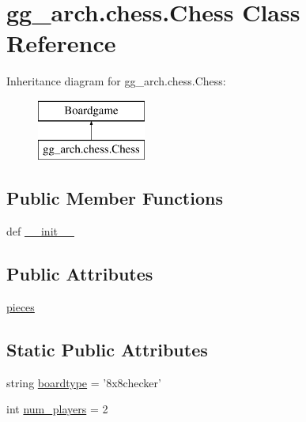\hypertarget{classgg__arch_1_1chess_1_1_chess}{\section{gg\-\_\-arch.\-chess.\-Chess Class Reference}
\label{classgg__arch_1_1chess_1_1_chess}
}
Inheritance diagram for gg\-\_\-arch.\-chess.\-Chess\-:\begin{figure}[H]
\begin{center}
\leavevmode
\includegraphics[height=2.000000cm]{classgg__arch_1_1chess_1_1_chess}
\end{center}
\end{figure}
\subsection*{Public Member Functions}
\begin{DoxyCompactItemize}
\item 
def \hyperlink{classgg__arch_1_1chess_1_1_chess_a2a82d2e17e698e72edbf8183b9e4a013}{\-\_\-\-\_\-init\-\_\-\-\_\-}
\end{DoxyCompactItemize}
\subsection*{Public Attributes}
\begin{DoxyCompactItemize}
\item 
\hyperlink{classgg__arch_1_1chess_1_1_chess_ad01e5c1a7c3416cab1f5b1b9cc22ea58}{pieces}
\end{DoxyCompactItemize}
\subsection*{Static Public Attributes}
\begin{DoxyCompactItemize}
\item 
string \hyperlink{classgg__arch_1_1chess_1_1_chess_aa82ec766cebfa6d144948a71f1dcf0d3}{boardtype} = '8x8checker'
\item 
int \hyperlink{classgg__arch_1_1chess_1_1_chess_a8d218ad53b70be5163ddeb252c144c70}{num\-\_\-players} = 2
\end{DoxyCompactItemize}



